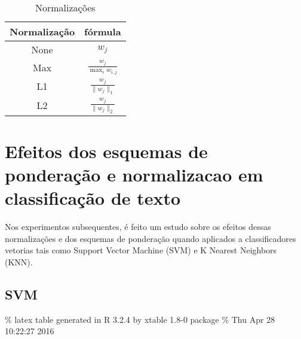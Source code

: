 \documentclass[]{book}
\begin{document}
\begin{table}[ht]
\centering
\begin{tabular}{|cc|}
\hline
  Normalização & fórmula\\ 
\hline
None & $w_j$\\
Max & $\frac{w_j}{\max_i w_{i,j}}$\\
L1 & $\frac{w_j}{\|w_{j}\|_1}$\\
L2 & $\frac{w_j}{\|w_{j}\|_2}$\\
\hline
\end{tabular}
\caption{Normalizações}
\label{tab:norms}
\end{table}

\section{Efeitos dos esquemas de ponderação e normalizacao em
classificação de
texto}\label{efeitos-dos-esquemas-de-ponderacao-e-normalizacao-em-classificacao-de-texto}

Nos experimentos subsequentes, é feito um estudo sobre os efeitos dessas
normalizações e dos esquemas de ponderação quando aplicados a
classificadores vetorias tais como Support Vector Machine (SVM) e K
Nearest Neighbors (KNN).

\subsection{SVM}\label{svm-1}

\% latex table generated in R 3.2.4 by xtable 1.8-0 package \% Thu Apr
28 10:22:27 2016
\end{document}
